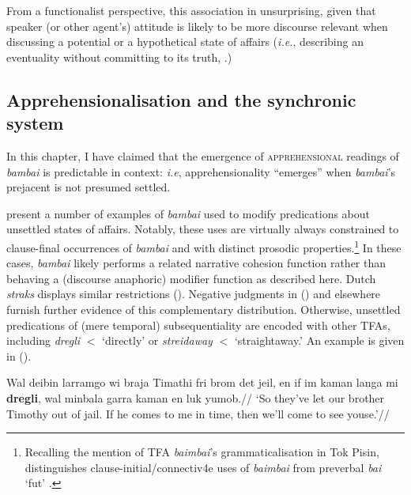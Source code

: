  From a functionalist perspective, this association in unsurprising, given that speaker (or other agent's) attitude is likely to be more discourse relevant when discussing a potential or a hypothetical state of affairs (\textit{i.e.}, describing an eventuality without committing to its truth, \citealp[see also][74-76]{Verstraete2006}.)

\subsection{Apprehensionalisation and the synchronic system}\label{subseq-sync}

In this chapter, I have claimed that the emergence of \textsc{apprehensional} readings of \textit{bambai} is predictable in context: \textit{i.e}, apprehensionality ``emerges'' when \textit{bambai}'s prejacent is not presumed settled.

\citet{Angelo2016} present a number of examples of \textit{bambai} used to modify predications about unsettled states of affairs. Notably, these uses are virtually always constrained to clause-final occurrences of \textit{bambai} and with distinct prosodic properties.\footnote{Recalling the mention of TFA \textit{baimbai}'s grammaticalisation in Tok Pisin, \citet{Romaine1995} distinguishes clause-initial/connectiv4e uses of \textit{baimbai} from preverbal \textit{bai} `\gls{fut}'
\citep[see also][271]{Bybee1994}.} In these cases, \textit{bambai} likely performs a related narrative cohesion function rather than behaving a (discourse anaphoric) modifier function as described here. Dutch \textit{straks} displays similar restrictions (). Negative judgments in () and elsewhere furnish further evidence of this complementary distribution. Otherwise, unsettled predications of (mere temporal) subsequentiality are encoded with other TFAs, including \textit{dregli} $ < $ `directly' or \textit{streidaway} $ < $ `straightaway.' An example is given in (\nextx).

\pex\begingl\gla  Wal deibin larramgo wi braja Timathi fri brom det jeil, en if im kaman langa mi \textbf{dregli}, wal minbala garra kaman en luk yumob.//
\glft `So they've let our brother Timothy out of jail. If he comes to me in time, then we'll come to see youse.'\trailingcitation{[KB~Hibrus 13:20]}//\endgl
\xe

